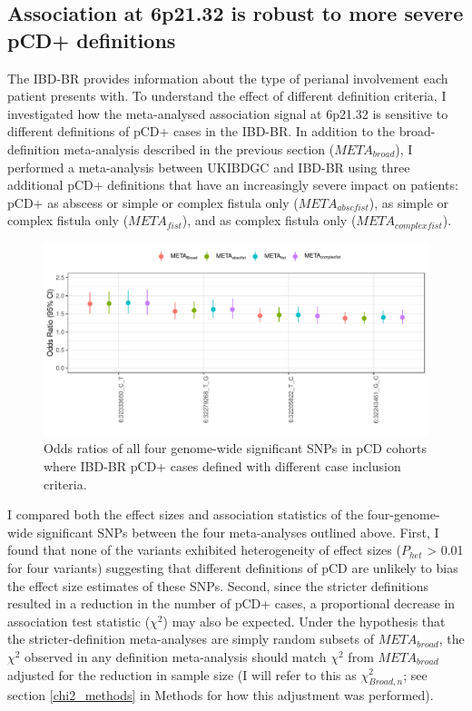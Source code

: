     \subsection{Association at 6p21.32 is robust to more severe pCD+ definitions}


The IBD-BR provides information about the type of perianal involvement each patient presents with. To understand the effect of different definition criteria, I investigated how the meta-analysed association signal at 6p21.32 is sensitive to different definitions of pCD+ cases in the IBD-BR. In addition to the broad-definition meta-analysis described in the previous section ($META_{broad}$), I performed a meta-analysis between UKIBDGC and IBD-BR using three additional pCD+ definitions that have an increasingly severe impact on patients: pCD+ as abscess or simple or complex fistula only ($META_{abscfist}$), as simple or complex fistula only ($META_{fist}$), and as complex fistula only ($META_{complexfist}$). 

\begin{figure}[H] 
  \centering    
  \includegraphics[width=1.0\textwidth]{pcd_def_or_plot}
  \caption[Effect sizes of genome-wide significant SNPs with different pCD definitions]{Odds ratios of all four genome-wide significant SNPs in pCD cohorts where IBD-BR pCD+ cases defined with different case inclusion criteria.}
  \label{fig:pcd_def_or_plot}
  \end{figure}


I compared both the effect sizes and association statistics of the four-genome-wide significant SNPs between the four meta-analyses outlined above. First, I found that none of the variants exhibited heterogeneity of effect sizes ($P_{het}$ > 0.01 for four variants) suggesting that different definitions of pCD are unlikely to bias the effect size estimates of these SNPs. Second, since the stricter definitions resulted in a reduction in the number of pCD+ cases, a proportional decrease in association test statistic ($\chi^{2}$) may also be expected. Under the hypothesis that the stricter-definition meta-analyses are simply random subsets of $META_{broad}$, the $\chi^{2}$  observed in any definition meta-analysis should match $\chi^{2}$ from $META_{broad}$ adjusted for the reduction in sample size (I will refer to this as $\chi^{2}_{Broad,n}$; see section \ref{chi2_methods} in Methods for how this adjustment was performed). \\

